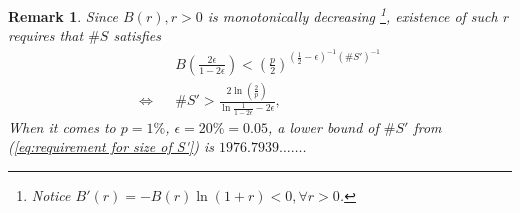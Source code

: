 \documentclass[11pt]{article}
\theoremstyle{numberplain}
\theoremstyle{nonumberplain}
\newtheorem{rem}{Remark}
\newcommand{\0}{{\mathbf{0}}}
\begin{document}
\begin{rem}
Since $B(r),r>0$ is monotonically decreasing
\footnote{ Notice $B'(r)=-B(r)\ln (1+r)<0,\forall r>0$.},
existence of such $r$ requires that $\# S $ satisfies 
\begin{eqnarray}
&& B\left( \frac{2\epsilon}{1-2\epsilon} \right) <   \left( \frac{  p  }{2} \right)^{\left(\frac{1}{2}-\epsilon \right)^{-1}(\# S')^{-1}}
\label{eq:B(r) efficient bound from selection of r}
\\
\Leftrightarrow && \# S' >
\frac{2\ln \left( \frac{2}{p} \right)}{\ln \frac{1}{1-2\epsilon}-2\epsilon},
\label{eq:condition for size of S'}
\end{eqnarray}
When it comes to $p=1\%$, $\epsilon=20\%=0.05$, a lower bound of $\#S'$ from (\ref{eq:requirement for size of S'}) is $1976.7939\ldots \ldots$.
\end{rem}
\end{document}
